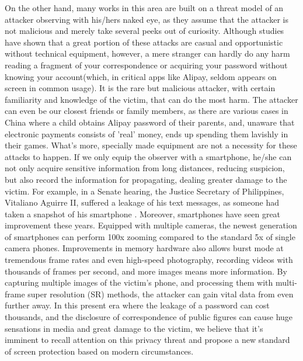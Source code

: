 On the other hand, many works in this area are built on a threat model of an attacker observing with his/hers naked eye, as they assume that the attacker is not malicious and merely take several peeks out of curiosity. Although studies have shown that a great portion of these attacks are casual and opportunistic without technical equipment\cite{eiband2017understanding}, however, a mere stranger can hardly do any harm reading a fragment of your correspondence or acquiring your password without knowing your account(which, in critical apps like Alipay, seldom appears on screen in common usage). It is the rare but malicious attacker, with certain familiarity and knowledge of the victim, that can do the most harm. The attacker can even be our closest friends or family members, as there are various cases in China where a child obtains Alipay password of their parents, and, unaware that electronic payments consists of 'real' money, ends up spending them lavishly in their games. What's more, specially made equipment are not a necessity for these attacks to happen. If we only equip the observer with a smartphone, he/she can not only acquire sensitive information from long distances, reducing suspicion, but also record the information for propagating, dealing greater damage to the victim. For example, in a Senate hearing, the Justice Secretary of Philippines, Vitaliano Aguirre II, suffered a leakage of his text messages, as someone had taken a snapshot of his smartphone \cite{Polotiko2017leakage}. Moreover, smartphones have seen great improvement these years. Equipped with multiple cameras, the newest generation of smartphones can perform 100x zooming compared to the standard 5x of single camera phones. Improvements in memory hardware also allows burst mode at tremendous frame rates and even high-speed photography, recording videos with thousands of frames per second, and more images means more information. By capturing multiple images of the victim's phone, and processing them with multi-frame super resolution (SR) methods, the attacker can gain vital data from even further away. In this present era where the leakage of a password can cost thousands, and the disclosure of correspondence of public figures can cause huge sensations in media and great damage to the victim, we believe that it's imminent to recall attention on this privacy threat and propose a new standard of screen protection based on modern circumstances.
 
